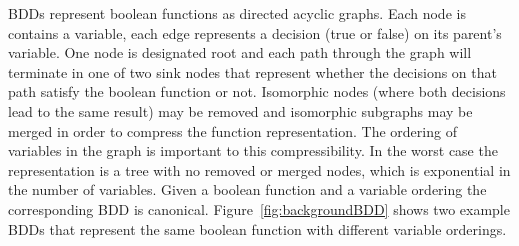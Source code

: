 BDDs represent boolean functions as directed acyclic graphs. Each node is contains a variable, each edge represents a decision (true or false) on its parent's variable. One node is designated root and each path through the graph will terminate in one of two sink nodes that represent whether the decisions on that path satisfy the boolean function or not. Isomorphic nodes (where both decisions lead to the same result) may be removed and isomorphic subgraphs may be merged in order to compress the function representation. The ordering of variables in the graph is important to this compressibility. In the worst case the representation is a tree with no removed or merged nodes, which is exponential in the number of variables. Given a boolean function and a variable ordering the corresponding BDD is canonical. Figure~\ref{fig:backgroundBDD} shows two example BDDs that represent the same boolean function with different variable orderings.

